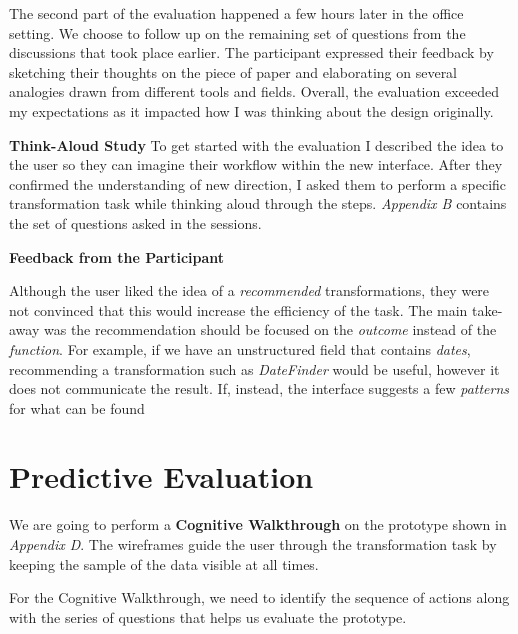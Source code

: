 \documentclass[12pt,letterpaper]{article}
\begin{document}
The second part of the evaluation happened a few hours later in the office setting. We choose to follow up on the remaining set of questions from the discussions that took place earlier. The participant expressed their feedback by sketching their thoughts on the piece of paper and elaborating on several analogies drawn from different tools and fields. Overall, the evaluation exceeded my expectations as it impacted how I was thinking about the design originally. 

\textbf{Think-Aloud Study}
To get started with the evaluation I described the idea to the user so they can imagine their workflow within the new interface. After they confirmed the understanding of new direction, I asked them to perform a specific transformation task while thinking aloud through the steps. \textit{Appendix B} contains the set of questions asked in the sessions.


\textbf{Feedback from the Participant}

Although the user liked the idea of a \textit{recommended} transformations, they were not convinced that this would increase the efficiency of the task. The main take-away was the recommendation should be focused on the \textit{outcome} instead of the \textit{function}. For example, if we have an unstructured field that contains \textit{dates}, recommending a transformation such as \textit{DateFinder} would be useful, however it does not communicate the result. If, instead, the interface suggests a few \textit{patterns} for what can be found 






\section*{Predictive Evaluation}

We are going to perform a \textbf{Cognitive Walkthrough} on the prototype shown in \textit{Appendix D}. The wireframes guide the user through the transformation task by keeping the sample of the data visible at all times. 

For the Cognitive Walkthrough, we need to identify the sequence of actions along with the series of questions that helps us evaluate the prototype.
\end{document}

